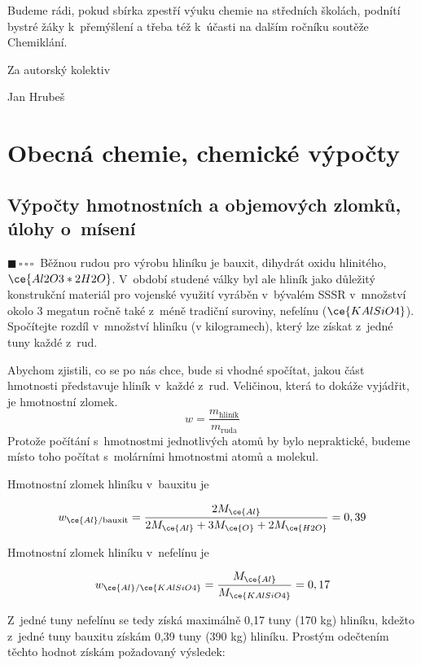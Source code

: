 \documentclass{book}
\newcommand{\jeden}{$\blacksquare \, \square \, \square \, \square \; \; $}
\renewenvironment{quotation}{\par}{\par} %
\begin{document}
Budeme rádi, pokud sbírka zpestří výuku chemie na středních školách, podnítí bystré žáky k~přemýšlení a třeba též k~účasti na dalším ročníku soutěže Chemiklání.\par
\vspace{18mm}
\noindent\-Za autorský kolektiv

Jan Hrubeš
\thispagestyle{empty}
\tableofcontents

\chapter{Obecná chemie, chemické výpočty}

\section{Výpočty hmotnostních a objemových zlomků, úlohy o~mísení}

\begin{quotation}
\jeden Běžnou rudou pro výrobu hliníku je bauxit, dihydrát oxidu hlinitého,
$\ce{Al2O3*2H2O}$. V~období studené války byl ale hliník jako důležitý
konstrukční materiál pro vojenské využití vyráběn v~bývalém SSSR v~množství okolo 3 megatun ročně také z~méně tradiční suroviny, nefelínu
($\ce{KAlSiO4}$). Spočítejte rozdíl v~množství hliníku (v kilogramech),
který lze získat z~jedné tuny každé z~rud.
\end{quotation} \dotfill \par 

Abychom zjistili, co se po nás chce, bude si vhodné spočítat, jakou část hmotnosti představuje hliník v~každé z~rud. Veličinou, která to dokáže vyjádřit, je hmotnostní zlomek.
\[
w = \frac{m_{\mathrm{hliník}}}{m_{\mathrm{ruda}}}
\]
Protože počítání s~hmotnostmi jednotlivých atomů by bylo nepraktické, budeme místo toho počítat s~molárními hmotnostmi atomů a molekul. 

Hmotnostní zlomek hliníku v~bauxitu je 

\[
w_{\ce{Al}/\mathrm{bauxit}}=\frac{2M_{\ce{Al}}}{2M_{\ce{Al}}+3M_{\ce{O}}+2M_{\ce{H2O}}}=0,39
\]

Hmotnostní zlomek hliníku v~nefelínu je

\[
w_{\ce{Al}/\ce{KAlSiO4}}=\frac{M_{\ce{Al}}}{M_{\ce{KAlSiO4}}}=0,17
\]

Z~jedné tuny nefelínu se tedy získá maximálně 0,17 tuny (170 kg) hliníku,
kdežto z~jedné tuny bauxitu získám 0,39 tuny (390 kg) hliníku. Prostým
odečtením těchto hodnot získám požadovaný výsledek:
\end{document}
